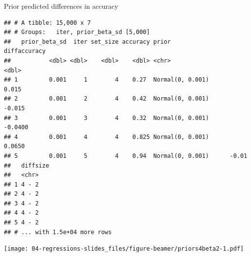 \documentclass[12pt,ignorenonframetext,aspectratio=169]{beamer}
\newenvironment{Shaded}{\begin{snugshade}}{\end{snugshade}}
\newcommand{\DataTypeTok}[1]{\textcolor[rgb]{0.13,0.29,0.53}{#1}}
\newcommand{\DecValTok}[1]{\textcolor[rgb]{0.00,0.00,0.81}{#1}}
\newcommand{\KeywordTok}[1]{\textcolor[rgb]{0.13,0.29,0.53}{\textbf{#1}}}
\newcommand{\NormalTok}[1]{#1}
\newcommand{\OperatorTok}[1]{\textcolor[rgb]{0.81,0.36,0.00}{\textbf{#1}}}
\newcommand{\StringTok}[1]{\textcolor[rgb]{0.31,0.60,0.02}{#1}}
\begin{document}
\begin{frame}[fragile]{Prior predicted differences in accuracy}
\protect\hypertarget{prior-predicted-differences-in-accuracy}{}

\scriptsize

\begin{Shaded}
\end{Shaded}

\begin{verbatim}
## # A tibble: 15,000 x 7
## # Groups:   iter, prior_beta_sd [5,000]
##   prior_beta_sd  iter set_size accuracy prior            diffaccuracy
##           <dbl> <dbl>    <dbl>    <dbl> <chr>                   <dbl>
## 1         0.001     1        4    0.27  Normal(0, 0.001)       0.015 
## 2         0.001     2        4    0.42  Normal(0, 0.001)      -0.015 
## 3         0.001     3        4    0.32  Normal(0, 0.001)      -0.0400
## 4         0.001     4        4    0.825 Normal(0, 0.001)       0.0650
## 5         0.001     5        4    0.94  Normal(0, 0.001)      -0.01  
##   diffsize
##   <chr>   
## 1 4 - 2   
## 2 4 - 2   
## 3 4 - 2   
## 4 4 - 2   
## 5 4 - 2   
## # ... with 1.5e+04 more rows
\end{verbatim}

\normalsize

\end{frame}

\begin{frame}[fragile]

\scriptsize

\begin{Shaded}
\end{Shaded}

\texttt{[image: 04-regressions-slides\_files/figure-beamer/priors4beta2-1.pdf]}

\normalsize

\end{frame}
\end{document}
